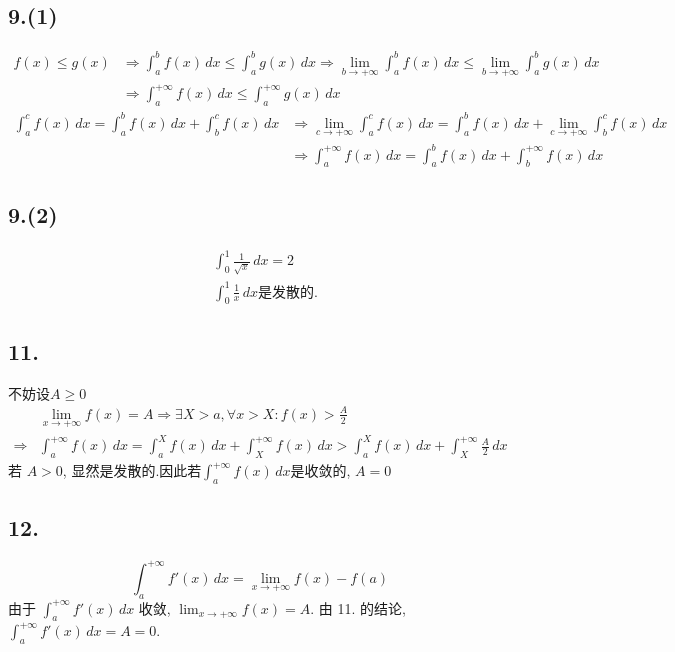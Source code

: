 \documentclass[12pt, a4paper, oneside]{ctexart}
\begin{document}
        \subsection*{9.(1)}
            $$
                \begin{aligned}
                    f(x)\leq g(x)&\Rightarrow \int_{a}^{b}f(x)\,dx\leq \int_{a}^{b}g(x)\,dx \Rightarrow \lim_{b\to+\infty} \int_{a}^{b}f(x)\,dx\leq \lim_{b\to+\infty}\int_{a}^{b}g(x)\,dx\\
                    &\Rightarrow\int_{a}^{+\infty}f(x)\,dx\leq \int_{a}^{+\infty}g(x)\,dx
                \end{aligned}
            $$
            $$
                \begin{aligned}
                    \int_{a}^{c}f(x)\,dx=\int_{a}^{b}f(x)\,dx+\int_{b}^{c}f(x)\,dx&\Rightarrow \lim_{c\to+\infty}\int_{a}^{c}f(x)\,dx=\int_{a}^{b}f(x)\,dx+\lim_{c\to+\infty}\int_{b}^{c}f(x)\,dx\\
                    &\Rightarrow \int_{a}^{+\infty}f(x)\,dx=\int_{a}^{b}f(x)\,dx+\int_{b}^{+\infty}f(x)\,dx
                \end{aligned}
            $$
        \subsection*{9.(2)}
            $$
                \begin{aligned}
                    & \int_{0}^{1}\frac{1}{\sqrt{x}}\,dx=2\\
                    & \int_{0}^{1}\frac1x\,dx \text{是发散的.}
                \end{aligned}
            $$
        \subsection*{11.}
            不妨设$A\geq 0$
            $$
                \begin{aligned}
                    &\lim_{x\to+\infty}f(x)=A\Rightarrow \exists X>a,\forall x>X:f(x)>\frac{A}{2}\\
                    \Rightarrow &\int_{a}^{+\infty}f(x)\,dx=\int_{a}^{X}f(x)\,dx+\int_{X}^{+\infty}f(x)\,dx>\int_{a}^{X}f(x)\,dx+\int_{X}^{+\infty}\frac{A}{2}\,dx
                \end{aligned}
            $$
            若 $A>0$, 显然是发散的.因此若$\int_{a}^{+\infty}f(x)\,dx$是收敛的, $A=0$
        \subsection*{12.}
            $$
                \int_{a}^{+\infty}f'(x)\,dx=\lim_{x\to+\infty}f(x)-f(a)
            $$
            由于 $\int_{a}^{+\infty}f'(x)\,dx$ 收敛, $\lim_{x\to+\infty}f(x)=A$.
            由 11. 的结论, $\int_{a}^{+\infty}f'(x)\,dx=A=0$.
\end{document}
